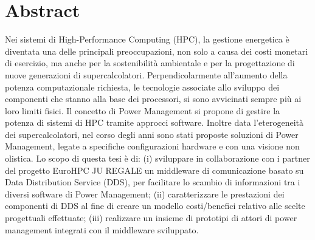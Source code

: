 \section*{Abstract}
Nei sistemi di High-Performance Computing (HPC), la gestione energetica è diventata una delle principali preoccupazioni, non solo a causa dei costi monetari di esercizio, ma anche per la sostenibilità ambientale e per la progettazione di nuove generazioni di supercalcolatori\cite{growth}. Perpendicolarmente all'aumento della potenza computazionale richiesta, le tecnologie associate allo sviluppo dei componenti che stanno alla base dei processori, si sono avvicinati sempre più ai loro limiti fisici. Il concetto di Power Management si propone di gestire la potenza di sistemi di HPC tramite approcci software. Inoltre data l'eterogeneità dei supercalcolatori, nel corso degli anni sono stati proposte soluzioni di Power Management, legate a specifiche configurazioni hardware e con una visione non olistica. %
Lo scopo di questa tesi è di: (i) sviluppare in collaborazione con i partner del progetto EuroHPC JU REGALE un middleware di comunicazione basato su Data Distribution Service (DDS), per facilitare lo scambio di informazioni tra i diversi software di Power Management; (ii) caratterizzare le prestazioni dei componenti di DDS al fine di creare un modello costi/benefici relativo alle scelte progettuali effettuate; (iii) realizzare un insieme di prototipi di attori di power management integrati con il middleware sviluppato.

